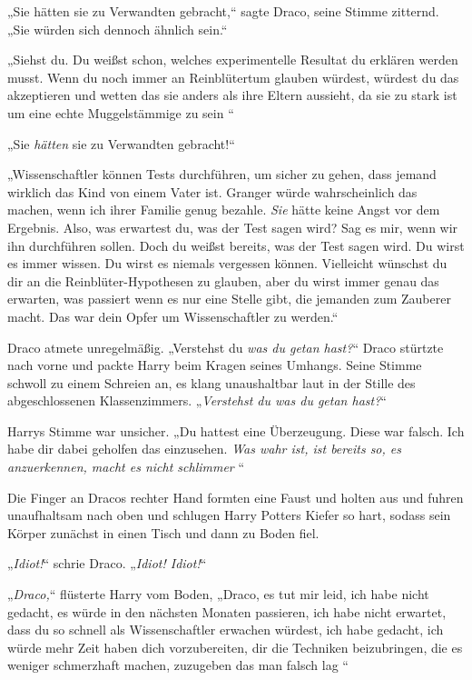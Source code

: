 {„Sie hätten sie zu Verwandten gebracht,“ sagte Draco, seine Stimme zitternd. „Sie würden sich dennoch ähnlich sein.“

„Siehst du. Du weißst schon, welches experimentelle Resultat du erklären werden musst. Wenn du noch immer an Reinblütertum glauben würdest, würdest du das akzeptieren und wetten das sie anders als ihre Eltern aussieht, da sie zu stark ist um eine echte Muggelstämmige zu sein \later“

„Sie \emph{hätten} sie zu Verwandten gebracht!“

„Wissenschaftler können Tests durchführen, um sicher zu gehen, dass jemand wirklich das Kind von einem Vater ist. Granger würde wahrscheinlich das machen, wenn ich ihrer Familie genug bezahle. \emph{Sie} hätte keine Angst vor dem Ergebnis. Also, was erwartest du, was der Test sagen wird? Sag es mir, wenn wir ihn durchführen sollen. Doch du weißst bereits, was der Test sagen wird. Du wirst es immer wissen. Du wirst es niemals vergessen können. Vielleicht wünschst du dir an die Reinblüter-Hypothesen zu glauben, aber du wirst immer genau das erwarten, was passiert wenn es nur eine Stelle gibt, die jemanden zum Zauberer macht. Das war dein Opfer um Wissenschaftler zu werden.“

Draco atmete unregelmäßig. „Verstehst du \emph{was du getan hast?}“ Draco stürtzte nach vorne und packte Harry beim Kragen seines Umhangs. Seine Stimme schwoll zu einem Schreien an, es klang unaushaltbar laut in der Stille des abgeschlossenen Klassenzimmers. „\emph{Verstehst du was du getan hast?}“

Harrys Stimme war unsicher. „Du hattest eine Überzeugung. Diese war falsch. Ich habe dir dabei geholfen das einzusehen. \emph{Was wahr ist, ist bereits so, es anzuerkennen, macht es nicht schlimmer \later}“

Die Finger an Dracos rechter Hand formten eine Faust und holten aus und fuhren unaufhaltsam nach oben und schlugen Harry Potters Kiefer so hart, sodass sein Körper zunächst in einen Tisch und dann zu Boden fiel.

„\emph{Idiot!}“ schrie Draco. „\emph{Idiot! Idiot!}“

„\emph{Draco,}“ flüsterte Harry vom Boden, „Draco, es tut mir leid, ich habe nicht gedacht, es würde in den nächsten Monaten passieren, ich habe nicht erwartet, dass du so schnell als Wissenschaftler erwachen würdest, ich habe gedacht, ich würde mehr Zeit haben dich vorzubereiten, dir die Techniken beizubringen, die es weniger schmerzhaft machen, zuzugeben das man falsch lag \later“

}
